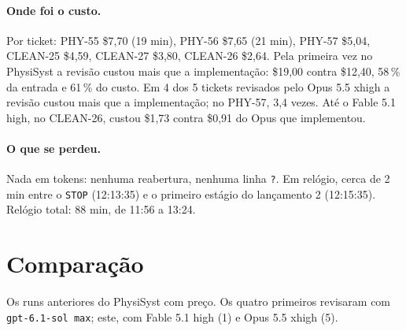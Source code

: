 \documentclass[11pt,a4paper]{article}
\begin{document}
\bigskip
\begin{center}
\end{center}

\paragraph{Onde foi o custo.} Por ticket: PHY-55 \$7,70 (19 min), PHY-56
\$7,65 (21 min), PHY-57 \$5,04, CLEAN-25 \$4,59, CLEAN-27 \$3,80, CLEAN-26
\$2,64. Pela primeira vez no PhysiSyst a revisão custou mais que a
implementação: \$19,00 contra \$12,40, 58\,\% da entrada e 61\,\% do custo. Em
4 dos 5 tickets revisados pelo Opus 5.5 xhigh a revisão custou mais que a
implementação; no PHY-57, 3,4 vezes. Até o Fable 5.1 high, no CLEAN-26, custou
\$1,73 contra \$0,91 do Opus que implementou.

\paragraph{O que se perdeu.} Nada em tokens: nenhuma reabertura, nenhuma linha
\texttt{?}. Em relógio, cerca de 2 min entre o \texttt{STOP} (12:13:35) e o
primeiro estágio do lançamento 2 (12:15:35). Relógio total: 88 min, de 11:56 a
13:24.

\section{Comparação}

Os runs anteriores do PhysiSyst com preço. Os quatro primeiros revisaram com
\texttt{gpt-6.1-sol max}; este, com Fable 5.1 high (1) e Opus 5.5 xhigh (5).
\end{document}
